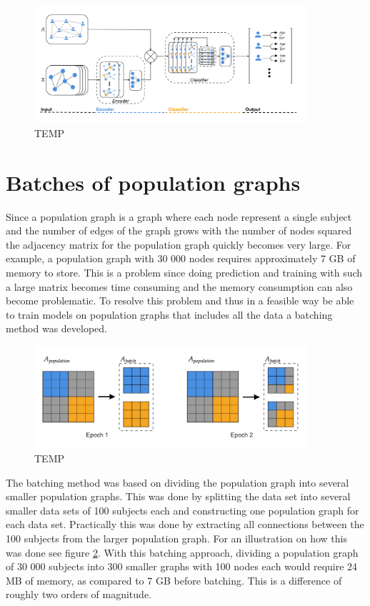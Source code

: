 \begin{figure}[H]
    \centering
    \includegraphics[width=0.9\textwidth]{chapters/images_methods/popencoder_v2.png}
    \caption{TEMP}
    \label{fig:popencoder}
\end{figure}

\section{Batches of population graphs}
Since a population graph is a graph where each node represent a single subject and the number of edges of the graph grows with the number of nodes squared the adjacency matrix for the population graph quickly becomes very large. For example, a population graph with 30 000 nodes requires approximately 7 GB of memory to store. This is a problem since doing prediction and training with such a large matrix becomes time consuming and the memory consumption can also become problematic. To resolve this problem and thus in a feasible way be able to train models on population graphs that includes all the data a batching method was developed. 

\begin{figure}[H]
    \centering
    \includegraphics[width=0.9\textwidth]{chapters/images_methods/batches.png}
    \caption{TEMP}
    \label{fig:batches}
\end{figure}

The batching method was based on dividing the population graph into several smaller population graphs. This was done by splitting the data set into several smaller data sets of 100 subjects each and constructing one population graph for each data set. Practically this was done by extracting all connections between the 100 subjects from the larger population graph. For an illustration on how this was done see figure \ref{fig:batches}. With this batching approach, dividing a population graph of 30 000 subjects into 300 smaller graphs with 100 nodes each would require 24 MB of memory, as compared to 7 GB before batching. This is a difference of roughly two orders of magnitude.

